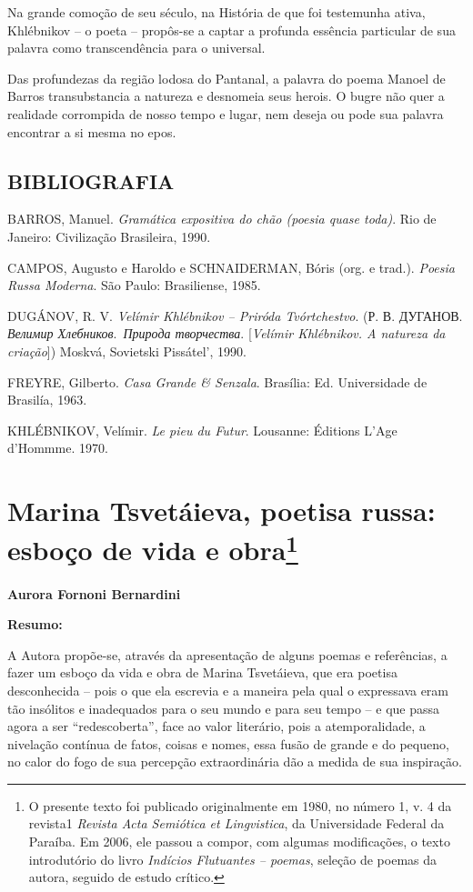 Na grande comoção de seu século, na História de que foi testemunha
ativa, Khlébnikov -- o poeta -- propôs-se a captar a profunda essência
particular de sua palavra como transcendência para o universal.

Das profundezas da região lodosa do Pantanal, a palavra do poema Manoel
de Barros transubstancia a natureza e desnomeia seus herois. O bugre não
quer a realidade corrompida de nosso tempo e lugar, nem deseja ou pode
sua palavra encontrar a si mesma no epos.

\section{BIBLIOGRAFIA}

BARROS, Manuel. \emph{Gramática expositiva do chão (poesia quase toda)}.
Rio de Janeiro: Civilização Brasileira, 1990.

CAMPOS, Augusto e Haroldo e SCHNAIDERMAN, Bóris (org. e trad.).
\emph{Poesia Russa Moderna}. São Paulo: Brasiliense, 1985.

DUGÁNOV, R. V. \emph{Velímir Khlébnikov -- Priróda Tvórtchestvo}. (Р. В.
ДУГАНОВ. \emph{Велимир Хлебников}.~\emph{Природа творчества}.
{[}\emph{Velímir Khlébnikov. A natureza da criação}{]}) Moskvá,
Sovietski Pissátel', 1990.

FREYRE, Gilberto. \emph{Casa Grande \& Senzala}. Brasília: Ed.
Universidade de Brasilía, 1963.

KHLÉBNIKOV, Velímir. \emph{Le pieu du Futur}. Lousanne: Éditions L'Age
d'Hommme. 1970.

\chapter{Marina Tsvetáieva, poetisa russa: esboço de vida e
obra\footnote{O presente texto foi publicado originalmente em 1980, no
  número 1, v. 4 da revista1 \emph{Revista Acta Semiótica et
  Lingvistica}, da Universidade Federal da Paraíba. Em 2006, ele passou
  a compor, com algumas modificações, o texto introdutório do livro
  \emph{Indícios Flutuantes -- poemas}, seleção de poemas da autora,
  seguido de estudo crítico.}}

\textbf{Aurora Fornoni Bernardini}

\textbf{Resumo: }

A Autora propõe-se, através da apresentação de alguns poemas e
referências, a fazer um esboço da vida e obra de Marina Tsvetáieva, que
era poetisa desconhecida -- pois o que ela escrevia e a maneira pela
qual o expressava eram tão insólitos e inadequados para o seu mundo e
para seu tempo -- e que passa agora a ser ``redescoberta'', face ao
valor literário, pois a atemporalidade, a nivelação contínua de fatos,
coisas e nomes, essa fusão de grande e do pequeno, no calor do fogo de
sua percepção extraordinária dão a medida de sua inspiração.

